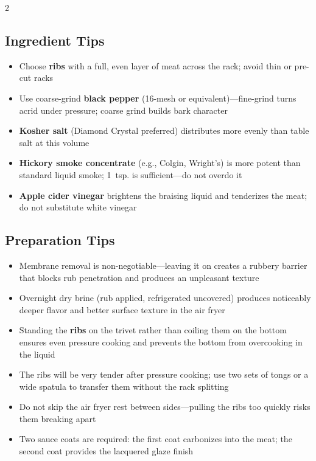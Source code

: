 \documentclass[11pt,letterpaper]{article}
\begin{document}
{\begin{multicols}{2}
\subsection*{Ingredient Tips}
\begin{itemize}
    \item Choose \textbf{ribs} with a full, even layer of meat across the rack; avoid thin or pre-cut racks
    \item Use coarse-grind \textbf{black pepper} (16-mesh or equivalent)---fine-grind turns acrid under pressure; coarse grind builds bark character
    \item \textbf{Kosher salt} (Diamond Crystal preferred) distributes more evenly than table salt at this volume
    \item \textbf{Hickory smoke concentrate} (e.g., Colgin, Wright's) is more potent than standard liquid smoke; 1~tsp. is sufficient---do not overdo it
    \item \textbf{Apple cider vinegar} brightens the braising liquid and tenderizes the meat; do not substitute white vinegar
\end{itemize}

\subsection*{Preparation Tips}
\begin{itemize}
    \item Membrane removal is non-negotiable---leaving it on creates a rubbery barrier that blocks rub penetration and produces an unpleasant texture
    \item Overnight dry brine (rub applied, refrigerated uncovered) produces noticeably deeper flavor and better surface texture in the air fryer
    \item Standing the \textbf{ribs} on the trivet rather than coiling them on the bottom ensures even pressure cooking and prevents the bottom from overcooking in the liquid
    \item The ribs will be very tender after pressure cooking; use two sets of tongs or a wide spatula to transfer them without the rack splitting
    \item Do not skip the air fryer rest between sides---pulling the ribs too quickly risks them breaking apart
    \item Two sauce coats are required: the first coat carbonizes into the meat; the second coat provides the lacquered glaze finish
\end{itemize}


\end{multicols}}
\end{document}
